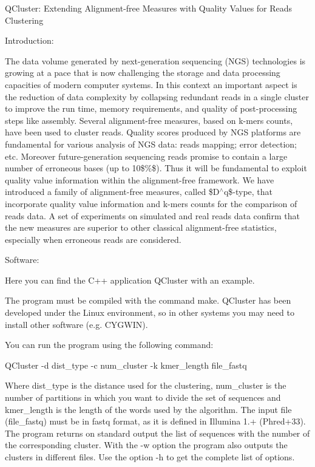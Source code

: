 QCluster\+: Extending Alignment-\/free Measures with Quality Values for Reads Clustering

Introduction\+:

The data volume generated by next-\/generation sequencing (NGS) technologies is growing at a pace that is now challenging the storage and data processing capacities of modern computer systems. In this context an important aspect is the reduction of data complexity by collapsing redundant reads in a single cluster to improve the run time, memory requirements, and quality of post-\/processing steps like assembly. Several alignment-\/free measures, based on k-\/mers counts, have been used to cluster reads. Quality scores produced by NGS platforms are fundamental for various analysis of NGS data\+: reads mapping; error detection; etc. Moreover future-\/generation sequencing reads promise to contain a large number of erroneous bases (up to 10\$\%\$). Thus it will be fundamental to exploit quality value information within the alignment-\/free framework. We have introduced a family of alignment-\/free measures, called \$D$^\wedge$q\$-\/type, that incorporate quality value information and k-\/mers counts for the comparison of reads data. A set of experiments on simulated and real reads data confirm that the new measures are superior to other classical alignment-\/free statistics, especially when erroneous reads are considered.

Software\+:

Here you can find the C++ application QCluster with an example.

The program must be compiled with the command \textquotesingle{}make\textquotesingle{}. QCluster has been developed under the Linux environment, so in other systems you may need to install other software (e.\+g. CYGWIN).

You can run the program using the following command\+:

QCluster -\/d dist\+\_\+type -\/c num\+\_\+cluster -\/k kmer\+\_\+length file\+\_\+fastq

Where dist\+\_\+type is the distance used for the clustering, num\+\_\+cluster is the number of partitions in which you want to divide the set of sequences and kmer\+\_\+length is the length of the words used by the algorithm. The input file (file\+\_\+fastq) must be in fastq format, as it is defined in Illumina 1.+ (Phred+33). The program returns on standard output the list of sequences with the number of the corresponding cluster. With the \textquotesingle{}-\/w\textquotesingle{} option the program also outputs the clusters in different files. Use the option \textquotesingle{}-\/h\textquotesingle{} to get the complete list of options.

